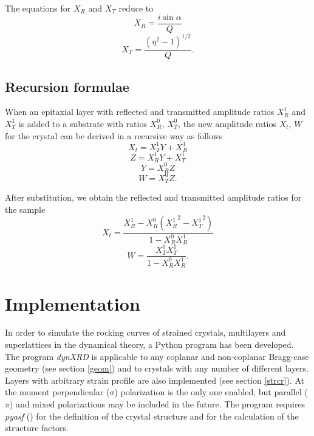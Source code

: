 \documentclass[12pt,oneside,notitlepage,abstracton,a4paper]{scrartcl}
\begin{document}
The equations for $X_R$ and $X_T$ reduce to
\begin{equation}\label{XR}
 X_R=\frac{i \sin{\alpha}}{Q}
 \end{equation}
\begin{equation}\label{XT}
 X_T=\frac{(\eta^2-1)^{1/2}}{Q}.
\end{equation}





\subsection{Recursion formulae}
When an epitaxial layer with reflected and transmitted amplitude ratios $X_R^1$ and $X_T^1$ is added to a substrate with ratios $X_R^0$, $X_T^0$, the new amplitude ratios $X_t$, $W$ for the crystal can be derived in a recursive way as follows
\begin{equation}
 X_t=X_T^1 Y+X_R^1
\end{equation}
\begin{equation}
 Z=X_R^1 Y+X_T^1
\end{equation}
\begin{equation}
 Y=X_R^0 Z
\end{equation}
\begin{equation}
 W=X_T^0 Z.
\end{equation}

After substitution, we obtain the reflected and transmitted amplitude ratios for the sample
\begin{equation}\label{refl}
 X_t=\frac{X_R^1-X_R^0({X_R^1}^2-{X_T^1}^2)}{1-X_R^0 X_R^1}
\end{equation}
\begin{equation}\label{trans}
 W=\frac{X_T^0 X_T^1}{1-X_R^0 X_R^1}.
\end{equation}






\section{Implementation}

In order to simulate the rocking curves of strained crystals, multilayers and superlattices in the dynamical theory, a Python program has been developed. The program \textit{dynXRD} is applicable to any coplanar and non-coplanar Bragg-case geometry (see section \ref{geom}) and to crystals with any number of different layers. Layers with arbitrary strain profile are also implemented (see section \ref{strcr}). At the moment perpendicular ($\sigma$) polarization is the only one enabled, but parallel ($\pi$) and mixed polarizations may be included in the future. The program requires \textit{pyasf} () for the definition of the crystal structure and for the calculation of the structure factors.
\end{document}

